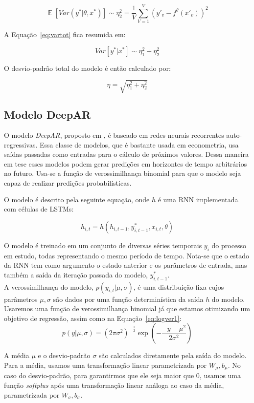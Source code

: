 \[
  \mathop{\mathbb{E}}[Var(y^* | \theta,x^*)] \sim \eta_2^2 = \frac{1}{V}\sum^V_{V=1}(y'_v - f^\theta(x'_v))^2
\]



A Equação~\ref{eq:vartot} fica resumida em:


\[ Var[y^* | x^*] \sim \eta^2_1 + \eta^2_2 \] 

O desvio-padrão total do modelo é então calculado por:

\[
  \eta = \sqrt{\eta^2_1 + \eta^2_2}  
\]


\subsection{Modelo DeepAR}

O modelo \textit{DeepAR}, proposto em \citep{deepar}, é baseado em redes neurais
recorrentes auto-regressivas. Essa classe de modelos, que é bastante usada em
econometria, usa saídas passadas como entradas para o cálculo de próximos
valores. Dessa maneira em tese esses modelos podem gerar predições em horizontes
de tempo arbitrários no futuro.
Usa-se a função de verossimilhança binomial para que o modelo seja capaz
de realizar predições probabilísticas.

O modelo é descrito pela seguinte equação, onde $h$ é uma RNN implementada com células de LSTMs:

\[
h_{i,t} = h(h_{i,t-1},y^*_{i,t-1},x_{i,t}, \theta)
\]

O modelo é treinado em um conjunto de diversas séries temporais $y_i$ do
processo em estudo, todas representando o mesmo período de tempo. Nota-se que o estado da RNN tem como argumento o estado anterior e os parâmetros de entrada, mas também a saída da iteração passada do modelo, $y^*_{i,t-1}$. \\

A verossimilhança do modelo, $p(y_{i,t} | \mu,\sigma)$, é uma distribuição fixa
cujos parâmetros $\mu, \sigma$ são dados por uma função determinística da saída $h$ do modelo. Usaremos uma função de verossimilhança binomial já que estamos otimizando um objetivo de regressão, assim como na Equação~\ref{eq:logver1}:
\[
  p(y | \mu,\sigma) = {(2\pi\sigma^2)}^{-\frac{1}{2}} \exp(-  \frac{-y - \mu^2}{2\sigma^2})  
\]

A média $\mu$ e o desvio-padrão $\sigma$ são calculados diretamente pela saída do modelo. Para a média, usamos uma transformação linear parametrizada por $W_{\mu},b_{\mu}$. No caso do desvio-padrão, para garantirmos que ele seja maior que 0, usamos uma função \textit{softplus} após uma transformação linear análoga ao caso da média, parametrizada por  $W_{\sigma},b_{\sigma}$.\\

